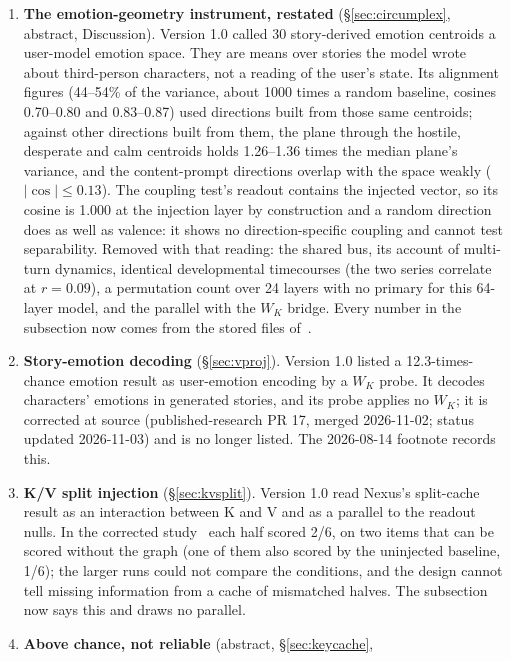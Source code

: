 \documentclass[11pt,a4paper]{article}
\begin{document}
\begin{enumerate}[nosep,leftmargin=*,resume]
\item \textbf{The emotion-geometry instrument, restated} (\S\ref{sec:circumplex},
  abstract, Discussion). Version 1.0 called 30 story-derived emotion
  centroids a user-model emotion space. They are means over stories the model
  wrote about third-person characters, not a reading of the user's state. Its
  alignment figures (44--54\% of the variance, about 1000 times a random
  baseline, cosines 0.70--0.80 and 0.83--0.87) used directions built from those
  same centroids; against other directions built from them, the plane through
  the hostile, desperate and calm centroids holds 1.26--1.36 times the median
  plane's variance, and the content-prompt directions overlap with the space
  weakly ($|\cos| \le 0.13$). The coupling test's readout contains the injected
  vector, so its cosine is 1.000 at the injection layer by construction and a
  random direction does as well as valence: it shows no direction-specific
  coupling and cannot test separability. Removed with that reading: the shared
  bus, its account of multi-turn dynamics, identical developmental timecourses
  (the two series correlate at $r = 0.09$), a permutation count over 24 layers
  with no primary for this 64-layer model, and the parallel with the $W_K$
  bridge. Every number in the subsection now comes from the stored files
  of~\citet{nexus2026coupling}.
\item \textbf{Story-emotion decoding} (\S\ref{sec:vproj}). Version 1.0 listed
  a 12.3-times-chance emotion result as user-emotion encoding by a $W_K$ probe.
  It decodes characters' emotions in generated stories, and its probe applies
  no $W_K$; it is corrected at source (published-research PR 17, merged
  2026-11-02; status updated 2026-11-03) and is no longer listed. The
  2026-08-14 footnote records this.
\item \textbf{K/V split injection} (\S\ref{sec:kvsplit}). Version 1.0
  read Nexus's split-cache result as an interaction between K and V and as a
  parallel to the readout nulls. In the corrected study~\citep{lyra2026nexus_kv}
  each half scored 2/6, on two items that can be scored without the graph (one
  of them also scored by the uninjected baseline, 1/6); the larger runs could
  not compare the conditions, and the design cannot tell missing information
  from a cache of mismatched halves. The subsection now says this and draws no
  parallel.
\item \textbf{Above chance, not reliable} (abstract, \S\ref{sec:keycache},

\end{enumerate}
\end{document}
